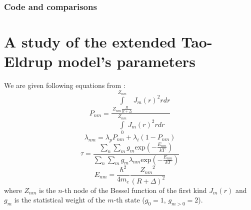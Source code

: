 \documentclass[a4paper]{article}
\begin{document}
	\subsubsection{Code and comparisons}
	\section{A study of the extended Tao-Eldrup model's parameters}
		We are given following equations from \cite{Zaleski2015}:
		\begin{equation}
			P_{nm} = 
				\frac
					{\int\limits_{Z_{nm}\frac{R}{R+\Delta}}^{Z_{nm}}J_m(r)^2rdr}
					{\int\limits_0^{Z_{nm}}J_m(r)^2rdr}
		\end{equation}
		\begin{equation}
			\lambda_{nm} = \lambda_pP_{nm} + \lambda_i(1-P_{nm})
		\end{equation}
		\begin{equation}
			\tau =
				\frac
					{\sum\limits_n\sum\limits_mg_m\mathrm{exp}\left(-\frac{E_{nm}}{kT}\right)}
					{\sum\limits_n\sum\limits_mg_m\lambda_{nm}\mathrm{exp}\left(-\frac{E_{nm}}{kT}\right)}
		\end{equation}
		\begin{equation*}
			E_{nm} = \frac{\hbar^2}{4m_e}\frac{{Z_{nm}}^2}{(R+\Delta)^2}
		\end{equation*}
		where $Z_{nm}$ is the $n$-th node of the Bessel function of the
		first kind $J_m(r)$ and $g_m$ is the statistical weight of the $m$-th state
		($g_0 = 1$, $g_{m>0}=2$).

	
	
\end{document}
